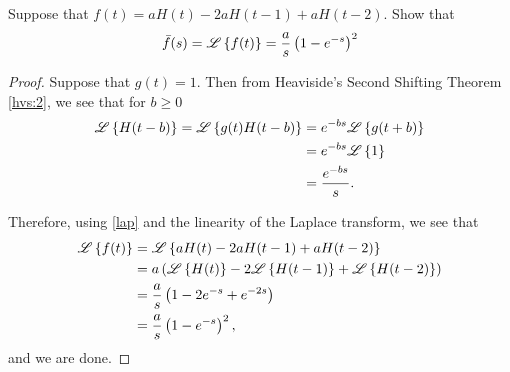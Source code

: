 \begin{problem}{3.34}
  Suppose that $f(t) = aH(t) -2a H(t-1) +aH(t-2)$. Show that
  \begin{align*}
    \bar{f}(s) = \mathscr{L}\left\{ {f(t)} \right\} = \frac{a}{s}\left(1-e^{-s}\right)^2
  \end{align*}
\end{problem}

\begin{proof}
  Suppose that $g(t) = 1$. Then from Heaviside's Second Shifting Theorem \eqref{hvs:2},
  we see that for $b \geq 0$
  \begin{align}\label{lap}
    \mathscr{L}\left\{ {H(t-b)} \right\} = \mathscr{L}\left\{ {g(t)H(t-b)} \right\}
    &= e^{-bs}\mathscr{L}\left\{ {g(t+b)} \right\} \notag \\
    &= e^{-bs}\mathscr{L}\left\{ {1} \right\} \notag \\
    &= \frac{e^{-bs}}{s}.
  \end{align}

  Therefore, using \eqref{lap} and the linearity of the Laplace transform, we see that
  \begin{align*}
    \mathscr{L}\left\{ {f(t)} \right\} &= \mathscr{L}\left\{ {aH(t) -2a H(t-1) +aH(t-2)} \right\} \\
    &= a\left(\mathscr{L}\left\{ {H(t)} \right\} -2 \mathscr{L}\left\{ {H(t-1)} \right\} + \mathscr{L}\left\{ {H(t-2)} \right\}\right) \\
    &= \frac{a}{s}\left(1 - 2e^{-s} + e^{-2s}\right) \\
    &= \frac{a}{s}\left(1-e^{-s}\right)^2,
  \end{align*}
  and we are done.
\end{proof}
\newpage
